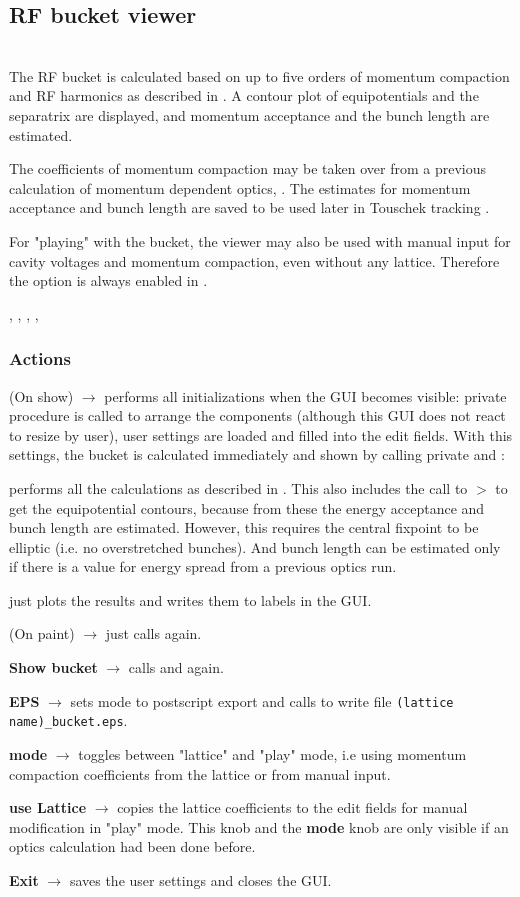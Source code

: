 \documentclass[12pt]{article}
\newcommand\code[1]{{\tt #1}}
\newcommand{\ofld}[1]{\colorbox{black!15}{{{\color{black}\bf #1}}}}
\newcommand{\ofldx}[1]{\colorbox{black!15}{{\color{black}(#1)}}}
\newcommand\guico[1]{{\color{blue}\code{#1}}}
\newcommand{\unico}[1]{{\color{burntorange}\code{#1}}}
\newcommand{\evcod}[2]{\ofld{#1} $\rightarrow$ \guico{#2}}
\newcommand{\evcodx}[2]{\ofldx{#1} $\rightarrow$ \guico{#2}}
\newcommand{\prcod}[2]{\opauni{#1}$>$\unico{#2}}
\newcommand{\opagui}[1]{\colorbox{blue!20}{{\color{black}\code{#1}}}}
\newcommand{\oguih}[2]{\subsection{\label{#2}#1}{\Huge\opagui{#2}}\\}
\newcommand{\ogui}[1]{\hyperref[#1]{\opagui{#1}}}
\newcommand{\opaguif}[1]{\colorbox{violet!30}{{\color{black}\code{#1}}}}
\newcommand{\oguif}[1]{\hyperref[#1]{\opaguif{#1}}}
\newcommand{\opauni}[1]{\colorbox{orange!30}{{\color{black}\code{#1}}}}
\newcommand{\ouni}[1]{\hyperref[#1]{\opauni{#1}}}
\newcommand{\uses}[1]{\flushleft {\bf Uses:} #1}
\newcommand{\desc}[1]{#1}
\newcommand{\act}[1]{\subsubsection*{Actions} #1}
\begin{document}
\oguih{RF bucket viewer}{opabucket}

\desc{
The RF bucket is calculated based on up to five orders of momentum compaction and RF harmonics as described in \cite{inside}. A contour plot of equipotentials and the separatrix are displayed, and momentum acceptance and the bunch length are estimated.

The coefficients of momentum compaction may be taken over from a previous calculation of momentum dependent optics, \ogui{opamomentum}. The estimates for momentum acceptance and bunch length are saved to be used later in Touschek tracking \ogui{opatracktt}.

For "playing" with the bucket, the viewer may also be used with manual input for cavity voltages and momentum compaction, even without any lattice. Therefore the option is always enabled in \ogui{opamenu}.
}

\uses{\ouni{globlib}, \ouni{mathlib}, \ouni{comcontourlib}, \oguif{comfigureframe}, \ouni{comauxlib}} 

\act{
\evcodx{On show}{FormShow} performs all initializations when the GUI becomes visible:  private procedure \guico{Layout} is called to arrange the components (although this GUI does not react to resize by user), user settings are loaded and filled into the edit fields. With this settings, the bucket is calculated immediately and shown by calling private \guico{CalcBucket} and \guico{MakePlot}:

\guico{CalcBucket} performs all the calculations as described in \cite{inside}. This also includes the call to \prcod{comconcrect}{conrec} to get the equipotential contours, because from these the energy acceptance and bunch length are estimated. However, this requires the central fixpoint to be elliptic (i.e. no overstretched bunches). And bunch length can be estimated only if there is a value for energy spread from a previous optics run.

\guico{MakePlot} just plots the results and writes them to labels in the GUI.

\evcodx{On paint}{FormPaint} just calls \guico{MakePlot} again.

\evcod{Show bucket}{butconClick} calls \guico{CalcBucket} and \guico{MakePlot} again.

\evcod{EPS}{butepsClick} sets mode to postscript export and calls \guico{MakePlot} to write file \code{(lattice name)\_bucket.eps}.

\evcod{mode}{butmodClick} toggles between "lattice" and "play" mode, i.e using momentum compaction coefficients from the lattice or from manual input. 

\evcod{use Lattice}{butcopyClick} copies the lattice coefficients to the edit fields for manual modification in "play" mode. This knob and the \ofld{mode} knob are only visible if an optics calculation had been done before.

\evcod{Exit}{butexClick} saves the user settings and closes the GUI.
}
\end{document}
